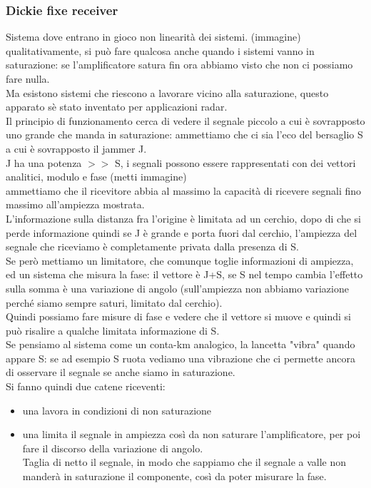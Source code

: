 \documentclass[oneside, 12pt]{extbook}
\begin{document}
\subsubsection{Dickie fixe receiver}
Sistema dove entrano in gioco non linearità dei sistemi.
(immagine)\\
qualitativamente, si può fare qualcosa anche quando i sistemi vanno in saturazione: se l'amplificatore satura fin ora abbiamo visto che non ci possiamo fare nulla.\\
Ma esistono sistemi che riescono a lavorare vicino alla saturazione, questo apparato sè stato inventato per applicazioni radar.\\
Il principio di funzionamento cerca di vedere il segnale piccolo a cui è sovrapposto uno grande che manda in saturazione: ammettiamo che ci sia l'eco del bersaglio S a cui è sovrapposto il jammer J.\\
J ha una potenza $>>$ S, i segnali possono essere rappresentati con dei vettori analitici, modulo e fase (metti immagine)\\
ammettiamo che il ricevitore abbia al massimo la capacità di ricevere segnali fino massimo all'ampiezza mostrata.\\
L'informazione sulla distanza fra l'origine è limitata ad un cerchio, dopo di che si perde informazione quindi se J è grande e porta fuori dal cerchio, l'ampiezza del segnale che riceviamo è completamente privata dalla presenza di S.\\
Se però mettiamo un limitatore, che comunque toglie informazioni di ampiezza, ed un sistema che misura la fase: il vettore è J+S, se S nel tempo cambia l'effetto sulla somma è una variazione di angolo (sull'ampiezza non abbiamo variazione perché siamo sempre saturi, limitato dal cerchio).\\
Quindi possiamo fare misure di fase e vedere che il vettore si muove e quindi si può risalire a qualche limitata informazione di S.\\
Se pensiamo al sistema come un conta-km analogico, la lancetta "vibra" quando appare S: se ad esempio S ruota vediamo una vibrazione che ci permette ancora di osservare il segnale se anche siamo in saturazione.\\
Si fanno quindi due catene riceventi:
\begin{itemize}
	\item una lavora in condizioni di non saturazione
	\item una limita il segnale in ampiezza così da non saturare l'amplificatore, per poi fare il discorso della variazione di angolo.\\
	Taglia di netto il segnale, in modo che sappiamo che il segnale a valle non manderà in saturazione il componente, così da poter misurare la fase.
\end{itemize}
\end{document}
